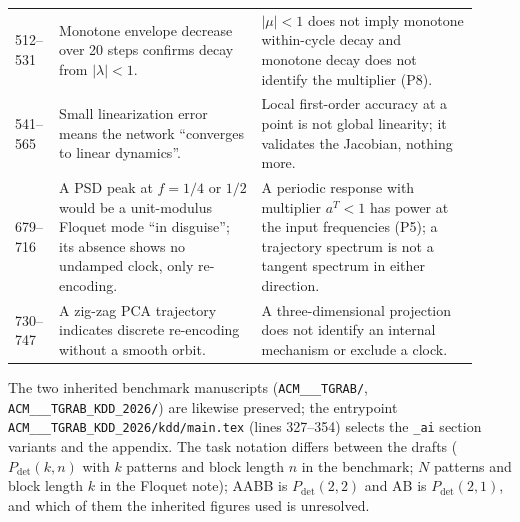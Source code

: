 \begin{table}[h]
\begin{tabular}{p{0.07\linewidth}p{0.41\linewidth}p{0.44\linewidth}}
512--531 & Monotone envelope decrease over 20 steps confirms decay from $|\lambda|<1$. & $|\mu|<1$ does not imply monotone within-cycle decay and monotone decay does not identify the multiplier (P8). \\
541--565 & Small linearization error means the network ``converges to linear dynamics''. & Local first-order accuracy at a point is not global linearity; it validates the Jacobian, nothing more. \\
679--716 & A PSD peak at $f=1/4$ or $1/2$ would be a unit-modulus Floquet mode ``in disguise''; its absence shows no undamped clock, only re-encoding. & A periodic response with multiplier $a^T<1$ has power at the input frequencies (P5); a trajectory spectrum is not a tangent spectrum in either direction. \\
730--747 & A zig-zag PCA trajectory indicates discrete re-encoding without a smooth orbit. & A three-dimensional projection does not identify an internal mechanism or exclude a clock. \\
\bottomrule
\end{tabular}
\end{table}

The two inherited benchmark manuscripts (\texttt{ACM\_\_\_TGRAB/}, \texttt{ACM\_\_\_TGRAB\_KDD\_2026/}) are likewise preserved; the entrypoint \texttt{ACM\_\_\_TGRAB\_KDD\_2026/kdd/main.tex} (lines 327--354) selects the \texttt{\_ai} section variants and the appendix. The task notation differs between the drafts ($P_{\mathrm{det}}(k,n)$ with $k$ patterns and block length $n$ in the benchmark; $N$ patterns and block length $k$ in the Floquet note); AABB is $P_{\mathrm{det}}(2,2)$ and AB is $P_{\mathrm{det}}(2,1)$, and which of them the inherited figures used is unresolved. 
